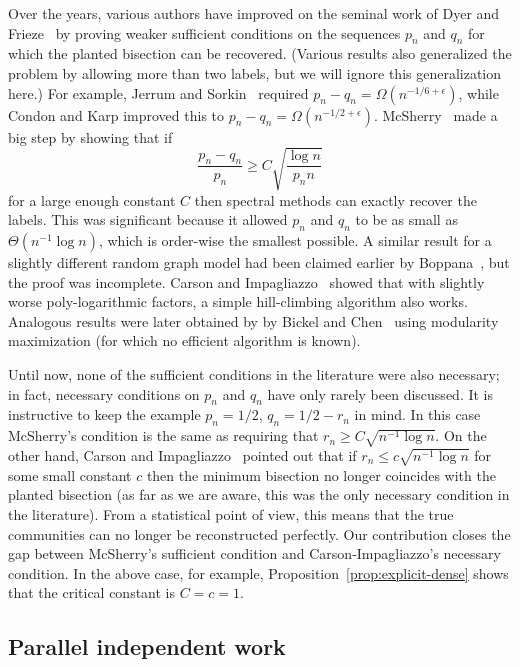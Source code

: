 \documentclass[EJP,final]{ejpecp}
\newcommand{\1}[1]{\mathbbm{1}_{\{#1\}}}
\begin{document}
Over the years, various authors have
improved on the seminal work of Dyer and Frieze~\cite{DF:89}
by proving weaker sufficient conditions on the sequences $p_n$ and $q_n$
for which the planted bisection
can be recovered. (Various results also generalized the problem by allowing
more than two labels, but we will ignore this generalization here.)
For example, Jerrum and Sorkin~\cite{JS:98}
required $p_n - q_n = \Omega(n^{-1/6 + \epsilon})$, while Condon and Karp
improved this to $p_n - q_n = \Omega(n^{-1/2 + \epsilon})$.
McSherry~\cite{M:01} made a big step by showing that if
\[
\frac{p_n-q_n}{p_n} \geq C \sqrt{\frac{\log n}{p_n n}}
\]
for a large enough constant $C$ then spectral methods can exactly recover the labels.
This was significant because it allowed $p_n$ and $q_n$ to be as small as $\Theta(n^{-1} \log n)$,
which is order-wise the smallest possible.
A similar result for a slightly different random graph model had
been claimed earlier by Boppana~\cite{B:87}, but the proof was incomplete.
Carson and Impagliazzo~\cite{CI:01} showed that with slightly worse poly-logarithmic factors,
a simple hill-climbing algorithm also works.
Analogous results were later obtained by by Bickel and Chen~\cite{BC:09} using
modularity maximization (for which no efficient algorithm is known).

Until now, none of the sufficient conditions in the literature
were also necessary; in fact, necessary conditions on $p_n$ and $q_n$
have only rarely been discussed.
It is instructive to keep the example $p_n=1/2$, $q_n = 1/2-r_n$ in mind. In this case
McSherry's condition is the same as requiring that
$r_n \geq C \sqrt{n^{-1} \log n}$.
On the other hand, Carson and Impagliazzo~\cite{CI:01} pointed out that if $r_n \le c \sqrt{n^{-1} \log n}$ for
some small constant $c$ then the minimum bisection no longer coincides with the planted bisection (as far as we are aware, this was the only necessary
condition in the literature).
From a statistical point of view, this means that the true communities can no longer be reconstructed
perfectly. Our contribution closes the gap between McSherry's sufficient condition and
Carson-Impagliazzo's necessary condition. In the above case, for example,
Proposition~\ref{prop:explicit-dense} shows that the critical
constant is $C = c = 1$.

\subsection{Parallel independent work}
\end{document}
